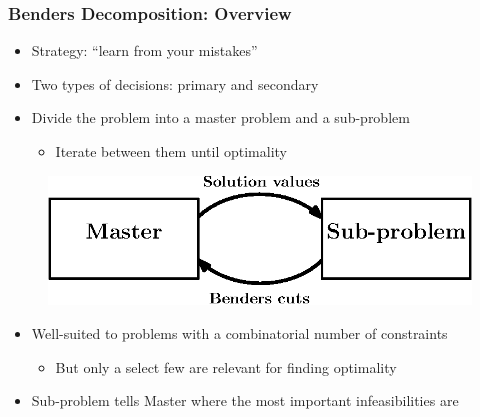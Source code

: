 \documentclass{beamer}
\begin{document}
\begin{frame}
\frametitle{Benders Decomposition: Overview}
\begin{itemize}
	\item Strategy: ``learn from your mistakes''\vspace{2mm}\pause
	\item Two types of decisions: {\color{red} primary} and {\color{red} secondary}\vspace{2mm}\pause
	\item Divide the problem into a master problem and a sub-problem \vspace{1mm}
	\begin{itemize}
		\item Iterate between them until optimality
	\end{itemize}
\end{itemize}
\begin{figure}
	\centering
	\includegraphics[height=0.3\textheight]{images/bendersAbstract.eps}
\end{figure}\pause
\begin{itemize}
	\item Well-suited to problems with a combinatorial number of constraints\vspace{1mm}
	\begin{itemize}
		\item But only a select few are relevant for finding optimality\vspace{3mm}\pause
	\end{itemize}
	\item Sub-problem tells Master where the most important infeasibilities are
\end{itemize}
\end{frame}
\end{document}
